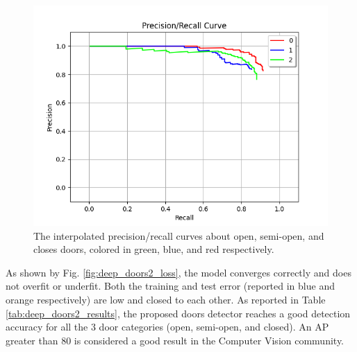 \begin{figure}[h!]
	\centering
	\includegraphics[width=0.93\linewidth]{images/deep_doors_2_precision_recall.png}
	\caption{The interpolated precision/recall curves about open, semi-open, and closes doors, colored in green, blue, and red respectively.}
	\label{fig:deep_doors2_ap_plot}
\end{figure} 

As shown by Fig. \ref{fig:deep_doors2_loss}, the model converges correctly and does not overfit or underfit. Both the training and test error (reported in blue and orange respectively) are low and closed to each other. As reported in Table \ref{tab:deep_doors2_results}, the proposed doors detector reaches a good detection accuracy for all the 3 door categories (open, semi-open, and closed). An AP greater than 80 is considered a good result in the Computer Vision community.

